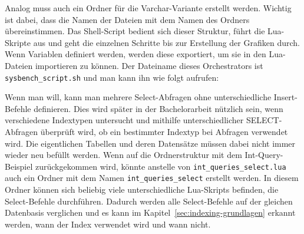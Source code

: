 Analog muss auch ein Ordner für die Varchar-Variante erstellt werden.
Wichtig ist dabei, dass die Namen der Dateien mit dem Namen des Ordners übereinstimmen.
Das Shell-Script bedient sich dieser Struktur, führt die Lua-Skripte aus und geht die einzelnen Schritte bis zur Erstellung der Grafiken durch.
Wenn Variablen definiert werden, werden diese exportiert, um sie in den Lua-Dateien importieren zu können.
Der Dateiname dieses Orchestrators ist \texttt{sysbench\_script.sh} und man kann ihn wie folgt aufrufen:

\vspace{-10pt}

\vspace{-5pt}

Wenn man will, kann man mehrere Select-Abfragen ohne unterschiedliche Insert-Befehle definieren.
Dies wird später in der Bachelorarbeit nützlich sein, wenn verschiedene Indextypen untersucht und mithilfe unterschiedlicher SELECT-Abfragen überprüft wird, ob ein bestimmter Indextyp bei Abfragen verwendet wird.
Die eigentlichen Tabellen und deren Datensätze müssen dabei nicht immer wieder neu befüllt werden.
Wenn auf die Ordnerstruktur mit dem Int-Query-Beispiel zurückgekommen wird, könnte anstelle von \texttt{int\_queries\_select.lua} auch ein Ordner mit dem Namen \texttt{int\_queries\_select} erstellt werden.
In diesem Ordner können sich beliebig viele unterschiedliche Lua-Skripts befinden, die Select-Befehle durchführen.
Dadurch werden alle Select-Befehle auf der gleichen Datenbasis verglichen und es kann im Kapitel~\ref{sec:indexing-grundlagen} erkannt werden, wann der Index verwendet wird und wann nicht.

